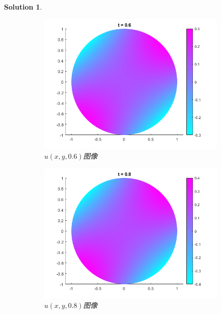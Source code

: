 \documentclass[a4paper, 12pt]{ctexart}
\theoremstyle{plain}
\theoremstyle{plain}
\theoremstyle{plain}
\theoremstyle{nonumberplain}
\newtheorem{solution}{Solution}
\begin{document}
\begin{solution}
\begin{figure}[H]
            \begin{subfigure}[b]{0.30\textwidth}
                \centering
                \includegraphics[width=\textwidth]{wc25.png}
                \caption{$u(x,y,0.6)$图像}
            \end{subfigure}
            \hfill
            \begin{subfigure}[b]{0.30\textwidth}
                \centering
                \includegraphics[width=\textwidth]{wc26.png}
                \caption{$u(x,y,0.8)$图像}
            \end{subfigure}
            \hfill
            \begin{subfigure}[b]{0.30\textwidth}
                \centering

\end{subfigure}
\end{figure}
\end{solution}
\end{document}
